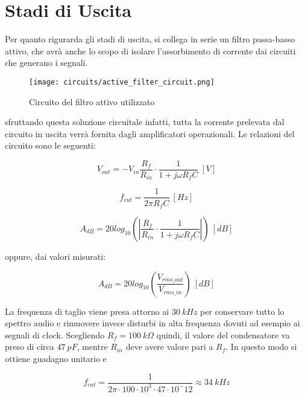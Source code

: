 \chapter{Stadi di Uscita}


Per quanto rigurarda gli stadi di uscita, si collega in serie un filtro passa-basso attivo,
che avrà anche lo scopo di isolare l'assorbimento di corrente dai circuiti che generano i
segnali.

\begin{figure}[H]
    \centering
    \texttt{[image: circuits/active\_filter\_circuit.png]}
    \caption{Circuito del filtro attivo utilizzato}
    \label{active_filter_circuit}
\end{figure}

sfruttando questa soluzione circuitale infatti, tutta la corrente prelevata dal circuito in
uscita verrà fornita dagli amplificatori operazionali. Le relazioni del circuito sono le
seguenti:

\begin{equation}\label{active_filter}
    V_{out}=-V_{in}\frac{R_f}{R_{in}}\cdot\frac{1}{1+j\omega R_fC}\ [V]
\end{equation}

\begin{equation}\label{fcut}
    f_{cut}=\frac{1}{2\pi R_fC}\ [Hz]
\end{equation}

\begin{equation}\label{gain1}
    A_{dB}=20log_{10}\left(\left|\frac{R_f}{R_{in}}\cdot\frac{1}{1+j\omega R_fC}\right|\right)\ [dB]
\end{equation}

oppure, dai valori misurati:

\begin{equation}\label{gain2}
    A_{dB}=20log_{10}\left(\frac{V_{rms\_out}}{V_{rms\_in}}\right)\ [dB]
\end{equation}

La frequenza di taglio viene presa attorno ai $30\ kHz$ per conservare tutto lo spettro audio
e rimuovere invece disturbi in alta frequenza dovuti ad esempio ai segnali di clock.
Scegliendo $R_f=100\ k\Omega$ quindi, il valore del condensatore va preso di circa $47\ pF$,
mentre $R_{in}$ deve avere valore pari a $R_f$. In questo modo si ottiene guadagno unitario e

\begin{equation}
    f_{cut}=\frac{1}{2\pi\cdot100\cdot10^3\cdot47\cdot10^-12}\approx34\ kHz
\end{equation}


